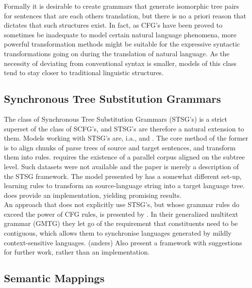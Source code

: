 \documentclass{report}
\theoremstyle{definition}
\theoremstyle{plain}
\begin{document}
Formally it is desirable to create grammars that generate isomorphic tree pairs for sentences that are each others translation, but there is no a priori reason that dictates that such structures exist. In fact, as CFG's have been proved to sometimes be inadequate to model certain natural language phenomena, more powerful transformation methods might be suitable for the expressive syntactic transformations going on during the translation of natural language. As the necessity of deviating from conventional syntax is smaller, models of this class tend to stay closer to traditional linguistic structures.

\subsection{Synchronous Tree Substitution Grammars}

The class of Synchronous Tree Substitution Grammars (STSG's) is a strict superset of the class of SCFG's, and STSG's are therefore a natural extension to them. Models working with STSG's are, i.a., \cite{poutsma2000data} and \cite{galley2004s,galley2006scalable}. The core method of the former is to align chunks of parse trees of source and target sentences, and transform them into rules. \cite{poutsma2000data} requires the existence of a parallel corpus aligned on the subtree level. Such datasets were not available and the paper is merely a description of the STSG framework.  The model presented by \citeauthor{galley2004s} has a somewhat different set-up, learning rules to transform an source-language string into a target language tree. \cite{galley2006scalable} does provide an implementation, yielding promising results.\\
An approach that does not explicitly use STSG's, but whose grammar rules do exceed the power of CFG rules, is presented by \cite{melamed2004generalized}. In their generalized multitext grammar (GMTG) they let go of the requirement that constituents need to be contiguous, which allows them to synchronise languages generated by mildly context-sensitive languages. (anders) Also \citeauthor{melamed2004generalized} present a framework with suggestions for further work, rather than an implementation.

\subsection{Semantic Mappings}
\end{document}
